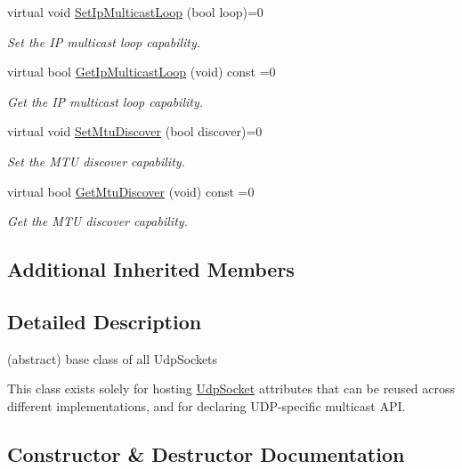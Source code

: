 \begin{DoxyCompactItemize}
virtual void \hyperlink{classns3_1_1UdpSocket_ab5c0ee492146d4639b717974ada67e93}{Set\+Ip\+Multicast\+Loop} (bool loop)=0
\begin{DoxyCompactList}\small\item\em Set the IP multicast loop capability. \end{DoxyCompactList}\item 
virtual bool \hyperlink{classns3_1_1UdpSocket_a3e28f54eb34f07e684927abac9dbeb38}{Get\+Ip\+Multicast\+Loop} (void) const =0
\begin{DoxyCompactList}\small\item\em Get the IP multicast loop capability. \end{DoxyCompactList}\item 
virtual void \hyperlink{classns3_1_1UdpSocket_ae3f06fb2459a7c09f91068905a063a6a}{Set\+Mtu\+Discover} (bool discover)=0
\begin{DoxyCompactList}\small\item\em Set the M\+TU discover capability. \end{DoxyCompactList}\item 
virtual bool \hyperlink{classns3_1_1UdpSocket_abd9c668464d5f89f17780fcd932777c2}{Get\+Mtu\+Discover} (void) const =0
\begin{DoxyCompactList}\small\item\em Get the M\+TU discover capability. \end{DoxyCompactList}\end{DoxyCompactItemize}
\subsection*{Additional Inherited Members}


\subsection{Detailed Description}
(abstract) base class of all Udp\+Sockets 

This class exists solely for hosting \hyperlink{classns3_1_1UdpSocket}{Udp\+Socket} attributes that can be reused across different implementations, and for declaring U\+D\+P-\/specific multicast A\+PI. 

\subsection{Constructor \& Destructor Documentation}
